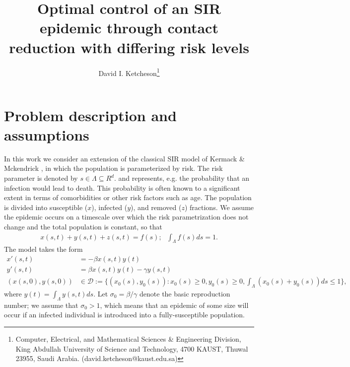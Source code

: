 \documentclass[english,12pt,letter]{article}
\newcommand{\Rnot}{\sigma_0}
\newcommand{\dom}{{\mathcal D}}
\begin{document}
\title{Optimal control of an SIR epidemic through contact reduction with differing risk levels}
\author{
  David I. Ketcheson\thanks{Computer, Electrical, and Mathematical Sciences \& Engineering Division,
King Abdullah University of Science and Technology, 4700 KAUST, Thuwal
23955, Saudi Arabia. (david.ketcheson@kaust.edu.sa)}
}
\maketitle


\section{Problem description and assumptions}
In this work we consider an extension of the
classical SIR model of Kermack \& Mckendrick \cite{kermack1927contribution}, in which
the population is parameterized by risk.  The risk parameter is denoted by $s\in\Lambda \subseteq R^d$.
and represents, e.g. the probability that an infection would lead to death.  This probability is
often known to a significant extent in terms of comorbidities or other risk factors such as age.
The population is divided into susceptible ($x$), infected ($y$), and removed ($z$) fractions.
We assume the epidemic occurs on a timescale over which the risk parametrization does
not change and the total population is constant, so that
\begin{align}
    x(s,t) + y(s,t) + z(s,t) = f(s); \ \ \ \int_\Lambda f(s) ds = 1.
\end{align}
The model takes the form
\begin{subequations} \label{SIR}
\begin{align} 
    x'(s,t) & = -\beta x(s,t) y(t) \\
    y'(s,t) & = \beta x(s,t) y(t) - \gamma y(s,t) \label{eq:y} \\
    (x(s,0),y(s,0)) & \in \dom := \{(x_0(s),y_0(s)) : x_0(s) \ge 0, y_0(s)\ge 0, \int_\Lambda (x_0(s)+y_0(s))ds \le 1\},
\end{align}
\end{subequations}
where $y(t)=\int_\Lambda y(s,t)ds$.  Let $\Rnot = \beta/\gamma$ denote the
basic reproduction number; we assume that $\Rnot>1$, which means that an epidemic of some
size will occur if an infected individual is introduced into a fully-susceptible population.
\end{document}
